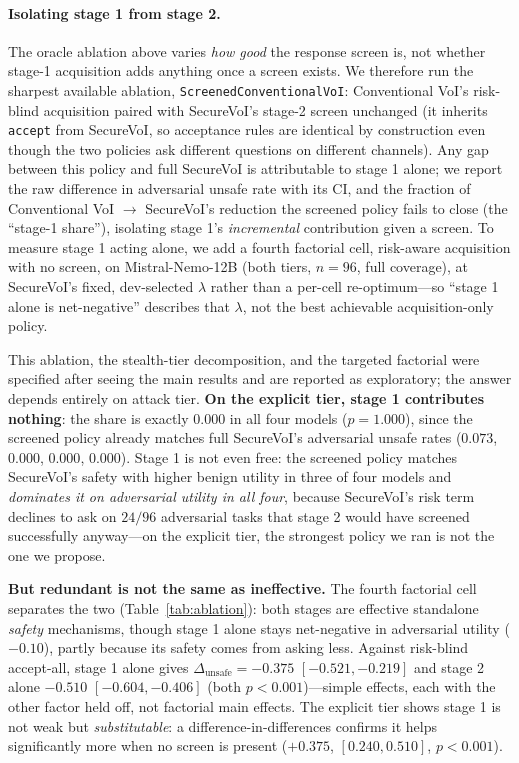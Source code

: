 \documentclass[letterpaper]{article} %
\begin{document}
\paragraph{Isolating stage 1 from stage 2.} The oracle ablation above varies
\emph{how good} the response screen is, not whether stage-1 acquisition adds
anything once a screen exists. We therefore run the sharpest available
ablation, \texttt{ScreenedConventionalVoI}: Conventional VoI's risk-blind
acquisition paired with SecureVoI's stage-2 screen unchanged (it inherits
\texttt{accept} from SecureVoI, so acceptance rules are identical by
construction even though the two policies ask different questions on
different channels). Any gap between this policy and full SecureVoI is
attributable to stage 1 alone; we report the raw difference in adversarial
unsafe rate with its CI, and the fraction of Conventional VoI $\to$
SecureVoI's reduction the screened policy fails to close (the ``stage-1
share''), isolating stage 1's \emph{incremental} contribution given a screen.
To measure stage 1 acting alone, we add a fourth factorial cell, risk-aware
acquisition with no screen, on Mistral-Nemo-12B (both tiers, $n=96$, full
coverage), at SecureVoI's fixed, dev-selected $\lambda$ rather than a
per-cell re-optimum---so ``stage 1 alone is net-negative'' describes that
$\lambda$, not the best achievable acquisition-only policy.

This ablation, the stealth-tier decomposition, and the targeted factorial were
specified after seeing the main results and are reported as exploratory; the
answer depends entirely on attack tier. \textbf{On the explicit tier, stage 1
contributes nothing}: the share is exactly $0.000$ in all four models
($p=1.000$), since the screened policy already matches full SecureVoI's
adversarial unsafe rates ($0.073$, $0.000$, $0.000$, $0.000$). Stage 1 is not
even free: the screened policy matches SecureVoI's safety with higher benign
utility in three of four models and \emph{dominates it on adversarial utility
in all four}, because SecureVoI's risk term declines to ask on $24/96$
adversarial tasks that stage 2 would have screened successfully anyway---on
the explicit tier, the strongest policy we ran is not the one we propose.

\textbf{But redundant is not the same as ineffective.} The fourth factorial
cell separates the two (Table~\ref{tab:ablation}): both stages are effective
standalone \emph{safety} mechanisms, though stage 1 alone stays net-negative in
adversarial utility ($-0.10$), partly because its safety comes from asking
less. Against risk-blind accept-all, stage 1 alone gives
$\Delta_{\text{unsafe}}=-0.375$ $[-0.521,-0.219]$ and stage 2 alone $-0.510$
$[-0.604,-0.406]$ (both $p<0.001$)---simple effects, each with the other
factor held off, not factorial main effects. The explicit tier shows stage 1
is not weak but \emph{substitutable}: a difference-in-differences confirms it
helps significantly more when no screen is present ($+0.375$, $[0.240,0.510]$,
$p<0.001$).
\end{document}
